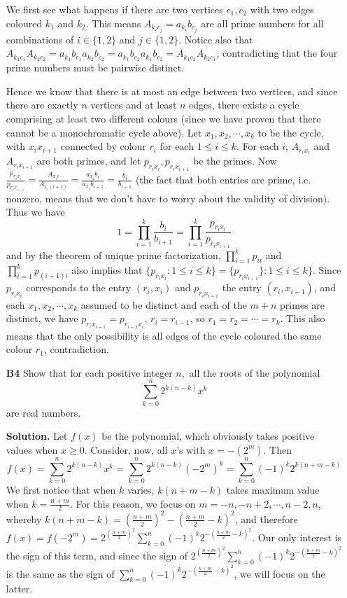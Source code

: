 \documentclass[11pt,a4paper]{article}
\newcommand{\<}{\langle}
\renewcommand{\>}{\rangle}
\begin{document}
\begin{enumerate}
	We first see what happens if there are two vertices $c_1, c_2$ with two edges coloured $k_1$ and $k_2$. This means $A_{k_ic_j}=a_{k_i}b_{c_j}$ are all prime numbers for all combinations of $i\in \{1, 2\}$ and $j\in \{1, 2\}$. Notice also that $A_{k_1c_1}A_{k_2c_2}=a_{k_1}b_{c_1}a_{k_2}b_{c_2}=a_{k_1}b_{c_2}a_{k_1}b_{c_2}=A_{k_1c_2}A_{k_2c_1}$, contradicting that the four prime numbers must be pairwise distinct. 
	
	Hence we know that there is at most an edge between two vertices, and since there are exactly $n$ vertices and at least $n$ edges, there exists a cycle comprising at least two different colours (since we have proven that there cannot be a monochromatic cycle above). Let $x_1, x_2, \cdots , x_k$ to be the cycle, with $x_ix_{i+1}$ connected by colour $r_i$ for each $1\le i\le k$. For each $i$, $A_{r_ix_i}$ and $A_{r_ix_{i+1}}$ are both primes, and let $p_{r_ix_i}, p_{r_ix_{i+1}}$ be the primes. Now $\frac{p_{r_ix_i}}{p_{r_ix_{i+1}}}=\frac{A_{x_ii}}{A_{x_i(i+1)}}=\frac{a_{x_i}b_i}{a_{x_i}b_{i+1}}=\frac{b_i}{b_{i+1}}$ (the fact that both entries are prime, i.e. nonzero, means that we don't have to worry about the validity of division). 
	Thus we have 
	\[1=\displaystyle\prod_{i=1}^k\frac{b_i}{b_{i+1}}=\displaystyle\prod_{i=1}^k \frac{p_{r_ix_i}}{p_{r_ix_{i+1}}}
	\]
	and by the theorem of unique prime factorization, $\displaystyle\prod_{i=1}^k p_{ii}$ and $\displaystyle\prod_{i=1}^k p_{(i+1)i}$ also implies that $\{p_{r_ix_i}: 1\le i\le k\}=\{p_{r_ix_{i+1}}\}: 1\le i\le k\}$. Since $p_{r_ix_i}$ corresponds to the entry $(r_i, x_i)$ and $p_{r_ix_{i+1}}$ the entry $(r_i, x_{i+1})$, and each $x_1, x_2, \cdots , x_k$ assumed to be distinct and each of the $m+n$ primes are distinct, we have $p_{r_ix_{i+1}}=p_{r_{i-1}x_i}$, $r_i=r_{i-1}$, so $r_1= r_2 = \cdots = r_k$. This also means that the only possibility is all edges of the cycle coloured the same colour $r_1$, contradiction. 
	
	\item[\textbf{B4}] Show that for each positive integer $n,$ all the roots of the polynomial \[\sum_{k=0}^n 2^{k(n-k)}x^k\] are real numbers.
	
	\textbf{Solution.} Let $f(x)$ be the polynomial, which obviously takes positive values when $x\ge 0$. Consider, now, all $x$'s with $x=-(2^m)$. Then 
	\[
	f(x) = \sum_{k=0}^n 2^{k(n-k)}x^k = \sum_{k=0}^n 2^{k(n-k)}(-2^m)^k
	=\sum_{k=0}^n (-1)^k 2^{k(n+m-k)}
	\]
	We first notice that when $k$ varies, $k(n+m-k)$ takes maximum value when $k=\frac{n+m}{2}$. For this reason, we focus on $m=-n, -n + 2, \cdots, n - 2, n$, whereby $k(n+m-k)=(\frac{n+m}{2})^2 - (\frac{n+m}{2}-k)^2$, and therefore $f(x)=f(-2^m) = 2^{(\frac{n+m}{2})^2}\displaystyle\sum_{k=0}^{n} (-1)^k 2^{- (\frac{n+m}{2}-k)^2}$. Our only interest is the sign of this term, and since the sign of $ 2^{(\frac{n+m}{2})^2}\displaystyle\sum_{k=0}^{n} (-1)^k 2^{- (\frac{n+m}{2}-k)^2}$ is the same as the sign of $\displaystyle\sum_{k=0}^{n} (-1)^k 2^{- (\frac{n+m}{2}-k)^2}$, we will focus on the latter. 
	

\end{enumerate}
\end{document}
